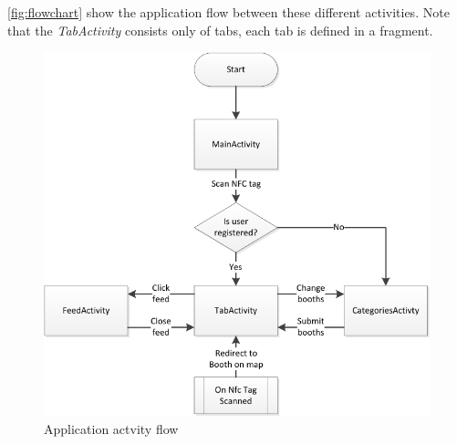 \autoref{fig:flowchart} show the application flow between these different activities. Note that the \textit{TabActivity} consists only of tabs, each tab is defined in a fragment.

\begin{figure}[H]
\centering
\includegraphics[width=\columnwidth]{img/appFlowchart.pdf}
\caption{Application actvity flow\label{fig:flowchart}}
\end{figure}

